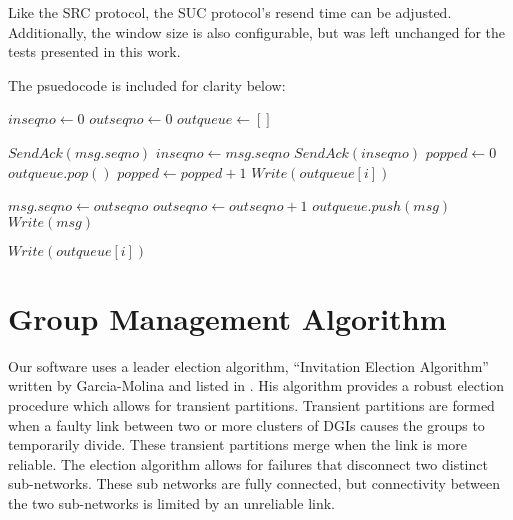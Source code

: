 Like the SRC protocol, the SUC protocol's resend time can be adjusted. 
Additionally, the window size is also configurable, but was left unchanged for 
the tests presented in this work.

The psuedocode is included for clarity below:

\begin{algorithmic}

\State $inseqno \gets 0$
\State $outseqno \gets 0$
\State $outqueue \gets []$

            \State $SendAck(msg.seqno)$
            \State $inseqno \gets msg.seqno$
        \Else
            \State $SendAck(inseqno)$
        \EndIf
        \State $popped \gets 0$
            \State $outqueue.pop()$
            \State $popped \gets popped+1$
        \EndIf
            \State $Write(outqueue[i])$
        \EndFor
    \EndIf
\EndFunction

    \State $msg.seqno \gets outseqno$
    \State $outseqno \gets outseqno+1$
    \State $outqueue.push(msg)$
        \State $Write(msg)$
    \EndIf
\EndFunction

        \State $Write(outqueue[i])$
    \EndFor
\EndFunction

\end{algorithmic}

\section{Group Management Algorithm}

Our software uses a leader election algorithm, ``Invitation Election 
Algorithm'' written by Garcia-Molina and listed in \cite{INVITATIONELECTION}. 
His algorithm provides a robust election procedure which allows for transient 
partitions. Transient partitions are formed when a faulty link between two or 
more clusters of DGIs causes the groups to temporarily divide. These transient 
partitions merge when the link is more reliable. The election algorithm 
allows for failures that disconnect two distinct sub-networks. These sub 
networks are fully connected, but connectivity between the two sub-networks is 
limited by an unreliable link.

